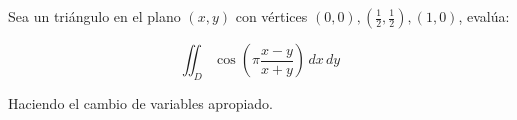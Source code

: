 Sea un triángulo en el plano \((x, y)\) con vértices \((0, 0), \left(\frac{1}{2}, \frac{1}{2}\right), (1, 0)\), evalúa:

\[
\iint_D \cos\left(\pi \frac{x-y}{x+y}\right) \, dx \, dy
\]

Haciendo el cambio de variables apropiado.

